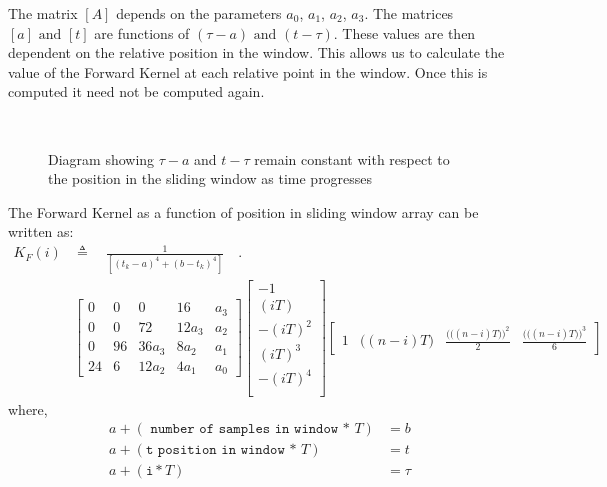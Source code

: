 \documentclass[letterpaper%
, twoside%
, 12pt%
,memoire%
, english%
,creativecommons,hyperref%
]{thETS}
\begin{document}
The matrix $[A]$ depends on the parameters $a_0$, $a_1$, $a_2$, $a_3$. The matrices $[a] \textrm{ and } [t]$ are functions of $(\tau-a) \textrm{ and } (t-\tau)$. These values are then dependent on the relative position in the window. This allows us to calculate the value of the Forward Kernel at each relative point in the window. Once this is computed it need not be computed again. 

\begin{figure}[H]
	\centering
	\resizebox{0.85\textwidth}{!}{\fbox{}}
	 \\ \parbox{0.8\textwidth}{\caption{Diagram showing $\tau -a$ and $t-\tau$ remain constant with respect to the position in the sliding window as time progresses \label{sliding_array}}}
\end{figure}

The Forward Kernel as a function of position in sliding window array can be written as:
\begin{align}
K_{F}(i)  &\triangleq \quad \frac{1}{[(t_k-a)^4+(b-t_k)^4]} \quad .\nonumber\\
&\begin{bmatrix}
0  &  0  &   0   &  16    &   a_3   \\
0  &  0  &   72   & 12a_3  &   a_2  \\
0  &  96 & 36a_3 &  8a_2  &   a_1   \\
24 &  6  & 12a_2 &  4a_1   &   a_0  
\end{bmatrix}
\begin{bmatrix}
  -1     \\
 (iT)    \\
-(iT)^2  \\
 (iT)^3  \\
-(iT)^4  \\
\end{bmatrix}
\begin{bmatrix}
1  & \big((n-i)T\big) & \frac{\Big(\big((n-i)T\big)\Big)^2}{2} & \frac{\Big(\big((n-i)T\big)\Big)^3}{6}
\end{bmatrix}
\label{Kfi}
\end{align}
where,
\begin{subequations}
\begin{align}
a+ (\texttt{ number of samples in window * } T)&= b \\ 
a+ (\texttt{t position in window * } T) &= t \\
a+ (\texttt{i}*T) &= \tau
\end{align}
\end{subequations}
\end{document}
